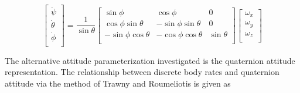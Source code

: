 \begin{equation}
  \begin{bmatrix}
    \dot{\psi} \\
    \dot{\theta} \\
    \dot{\phi} \\
  \end{bmatrix}
  =
  \frac{1}{\sin \theta}
  \begin{bmatrix}
    \sin \phi & \cos \phi & 0 \\
    \cos \phi \sin \theta & -\sin \phi \sin \theta & 0 \\
    -\sin \phi \cos \theta & -\cos \phi \cos \theta & \sin \theta \\
  \end{bmatrix}
  \begin{bmatrix}
    \omega_x \\
    \omega_y \\
    \omega_z \\
  \end{bmatrix}
  \label{eqn:BodyRateToEuler}
\end{equation}

The alternative attitude parameterization investigated is the quaternion attitude representation.  The relationship between discrete body rates and quaternion attitude via the method of Trawny and Roumeliotis \cite{marslab} is given as

